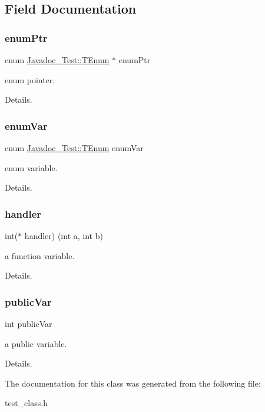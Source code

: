 \subsection{Field Documentation}
\mbox{\label{class_javadoc___test_ab994283d87e01a8bbe197a9c8eac7c06}} 
\subsubsection{\texorpdfstring{enum\+Ptr}{enumPtr}}
{\footnotesize\ttfamily enum \mbox{\hyperlink{class_javadoc___test_a33e3643b66dfa91e4fb7cc663a23e166}{Javadoc\+\_\+\+Test\+::\+T\+Enum}} 
       $\ast$ enum\+Ptr}



enum pointer. 

Details. \mbox{\label{class_javadoc___test_a1e1e81400c78c4a5992888bd484d9d68}} 
\subsubsection{\texorpdfstring{enum\+Var}{enumVar}}
{\footnotesize\ttfamily enum \mbox{\hyperlink{class_javadoc___test_a33e3643b66dfa91e4fb7cc663a23e166}{Javadoc\+\_\+\+Test\+::\+T\+Enum}}
        enum\+Var}



enum variable. 

Details. \mbox{\label{class_javadoc___test_a83e6d7b763dc413e96b0c435a1d29a5d}} 
\subsubsection{\texorpdfstring{handler}{handler}}
{\footnotesize\ttfamily int($\ast$ handler) (int a, int b)}



a function variable. 

Details. \mbox{\label{class_javadoc___test_a292887ac25652b1d8448430f583378c3}} 
\subsubsection{\texorpdfstring{public\+Var}{publicVar}}
{\footnotesize\ttfamily int public\+Var}



a public variable. 

Details. 

The documentation for this class was generated from the following file\+:\begin{DoxyCompactItemize}
\item 
test\+\_\+class.\+h\end{DoxyCompactItemize}
